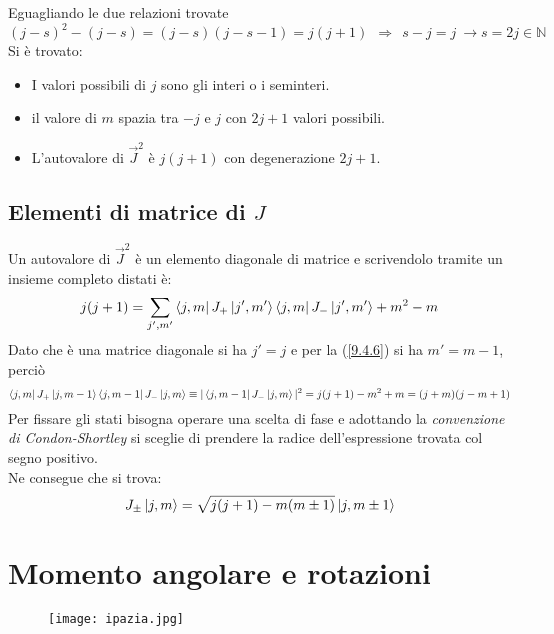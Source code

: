 \documentclass[twoside]{article}
\begin{document}
Eguagliando le due relazioni trovate
\begin{equation}
    (j-s)^2-(j-s)=(j-s)(j-s-1)=j(j+1) \ \ \Rightarrow \ \ s-j=j \ \to s=2j \in \mathds{N}
\end{equation}
Si è trovato:
\begin{itemize}
    \item I valori possibili di $j$ sono gli interi o i seminteri.
    \item il valore di $m$ spazia tra $-j$ e $j$ con $2j+1$ valori possibili.
    \item L'autovalore di $\Vec{J}^2$ è $j(j+1)$ con degenerazione $2j+1$.
\end{itemize}

\subsection{Elementi di matrice di \texorpdfstring{$J$}{Lg}}

Un autovalore di $\Vec{J}^2$ è un elemento diagonale di matrice e scrivendolo tramite un insieme completo distati è:
\begin{equation}
    j(j+1)=\sum_{j',m'}\bra{j,m}J_+\ket{j',m'}\bra{j,m}J_-\ket{j',m'}+m^2-m
\end{equation}
Dato che è una matrice diagonale si ha $j'=j$ e per la (\ref{9.4.6}) si ha $m'=m-1$, perciò
\begin{equation}
    \bra{j,m}J_+\ket{j,m-1}\bra{j,m-1}J_-\ket{j,m}\equiv |\bra{j,m-1}J_-\ket{j,m}|^2=j(j+1)-m^2+m=(j+m)(j-m+1)
\end{equation}
Per fissare gli stati bisogna operare una scelta di fase e adottando la \textit{convenzione di Condon-Shortley} si sceglie di prendere la radice dell'espressione trovata col segno positivo.
\\
Ne consegue che si trova:
\begin{equation}
    J_{\pm}\ket{j,m}=\sqrt{j(j+1)-m(m\pm1)}\ket{j,m\pm 1}
\end{equation}

\newpage
\section{Momento angolare e rotazioni}

\begin{wrapfigure}[4]{L}{0.2\textwidth}
  \begin{center}
    \texttt{[image: ipazia.jpg]}
  \end{center}
\end{wrapfigure}\leavevmode
\end{document}
